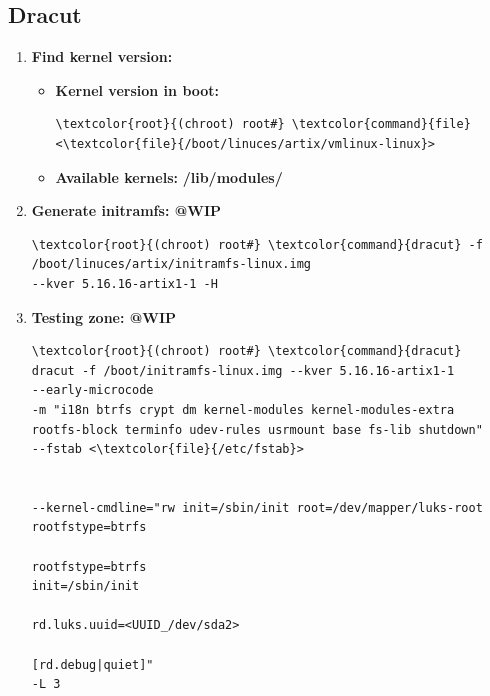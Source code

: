 \documentclass[10pt, a4paper, onecolumn, oneside, titlepage, openany]{book}
\begin{document}
\subsection{Dracut}
\begin{enumerate}
    \item \textbf{Find kernel version:}
    \begin{itemize}
        \item \textbf{Kernel version in boot:}
\begin{Verbatim}[commandchars=\\\{\}]
\textcolor{root}{(chroot) root#} \textcolor{command}{file} <\textcolor{file}{/boot/linuces/artix/vmlinux-linux}>
\end{Verbatim}
        \item \textbf{Available kernels:}
\newline \textbf{\textcolor{dir}{/lib/modules/}}
    \end{itemize}
    \item \textbf{Generate initramfs: @WIP}
\begin{Verbatim}[commandchars=\\\{\}]
\textcolor{root}{(chroot) root#} \textcolor{command}{dracut} -f /boot/linuces/artix/initramfs-linux.img
--kver 5.16.16-artix1-1 -H
\end{Verbatim}
    \item \textbf{Testing zone: @WIP}
\begin{Verbatim}[commandchars=\\\{\}]
\textcolor{root}{(chroot) root#} \textcolor{command}{dracut}
dracut -f /boot/initramfs-linux.img --kver 5.16.16-artix1-1
--early-microcode
-m "i18n btrfs crypt dm kernel-modules kernel-modules-extra
rootfs-block terminfo udev-rules usrmount base fs-lib shutdown"
--fstab <\textcolor{file}{/etc/fstab}>


--kernel-cmdline="rw init=/sbin/init root=/dev/mapper/luks-root rootfstype=btrfs

rootfstype=btrfs
init=/sbin/init

rd.luks.uuid=<UUID_/dev/sda2>

[rd.debug|quiet]"
-L 3
\end{Verbatim}
\end{enumerate}
\end{document}
